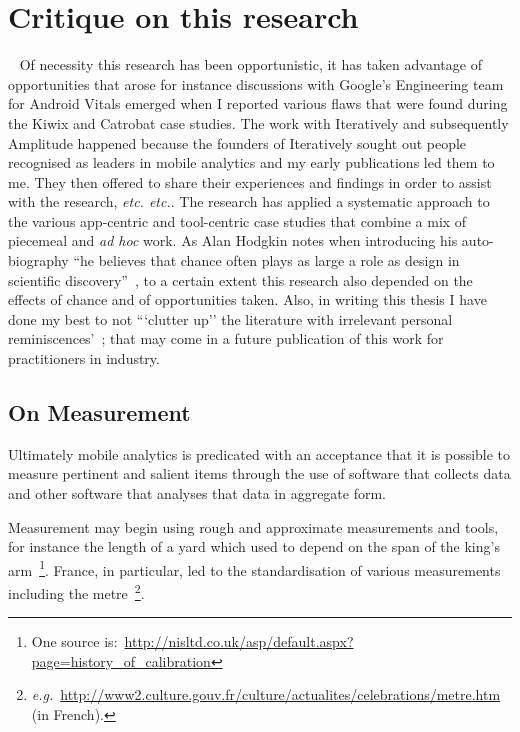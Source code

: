 \section{Critique on this research}~\label{discussion-critique-on-this-research}
Of necessity this research has been opportunistic, it has taken advantage of opportunities that arose for instance discussions with Google's Engineering team for Android Vitals emerged when I reported various flaws that were found during the Kiwix and Catrobat case studies. The work with Iteratively and subsequently Amplitude happened because the founders of Iteratively sought out people recognised as leaders in mobile analytics and my early publications led them to me. They then offered to share their experiences and findings in order to assist with the research, \emph{etc. etc.}. The research has applied a systematic approach to the various app-centric and tool-centric case studies that combine a mix of piecemeal and \emph{ad hoc} work. As Alan Hodgkin notes when introducing his auto-biography ``he believes that chance often plays as large a role as design in scientific discovery''~, to a certain extent this research also depended on the effects of chance and of opportunities taken. Also, in writing this thesis I have done my best to not ```clutter up'' the literature with irrelevant personal reminiscences'~; that may come in a future publication of this work for practitioners in industry. 

\subsection{On Measurement}
Ultimately mobile analytics is predicated with an acceptance that it is possible to measure pertinent and salient items through the use of software that collects data and other software that analyses that data in aggregate form.

Measurement may begin using rough and approximate measurements and tools, for instance the length of a yard which used to depend on the span of the king's arm~\footnote{One source is:~\url{http://nisltd.co.uk/asp/default.aspx?page=history_of_calibration}}. France, in particular, led to the standardisation of various measurements including the metre~\footnote{\emph{e.g.}~\url{http://www2.culture.gouv.fr/culture/actualites/celebrations/metre.htm} (in French).}. 

